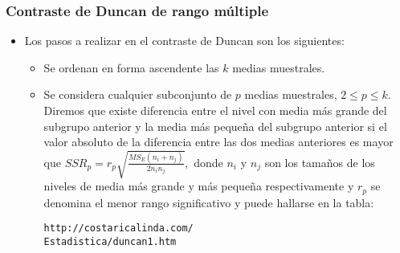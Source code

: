 \begin{frame}[fragile]
\frametitle{Contraste de Duncan de rango múltiple}
\begin{itemize}
\item<2-> Los pasos a realizar en el contraste de Duncan son los siguientes:
\begin{itemize}
\item<3-> Se ordenan en forma ascendente las $k$ medias muestrales.
\item<4-> Se considera cualquier subconjunto de $p$ medias muestrales, $2\leq p\leq k$. Diremos que existe diferencia entre el nivel con media más
grande del subgrupo anterior y la media más pequeña del subgrupo anterior si el valor absoluto de la diferencia entre las dos medias anteriores es
mayor que $SSR_p = r_p \sqrt{\frac{MS_E (n_i +n_j)}{2 n_i n_j}},$
donde $n_i$ y $n_j$ son los tamaños de los niveles de media más grande y más pequeña respectivamente y $r_p$ se denomina el menor rango significativo
y puede hallarse en la tabla:
{
\begin{verbatim}
http://costaricalinda.com/
Estadistica/duncan1.htm
\end{verbatim}}
\end{itemize}
\end{itemize}
\end{frame}
